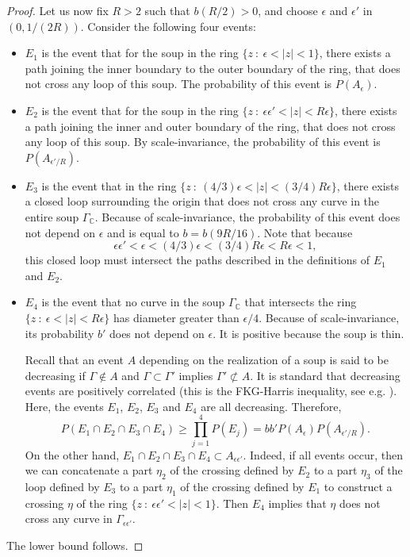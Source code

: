 \documentclass[11pt]{article}
\newcommand{\C}{{{\mathbb C}}}
\newcommand{\eps}{\epsilon}
\newcommand{\PP}{{ P}}
\newcommand{\pa}[1]{\PP (A_{#1})}
\begin{document}
\begin{proof}
Let us now fix $R > 2$ such that $b (R/2)>0$, and  
choose $\eps$ and $\eps'$ in $(0, 1/(2R))$.
Consider the following four events:
\begin {itemize}
\item
$E_1$ is the event that for the soup in the ring $\{z \ : \ \eps < |z | < 1 \}$, 
there exists a path joining the inner boundary to the outer boundary of the ring, 
that does not cross any loop of this soup.
The probability of this event is $\pa { \eps}$.
\item
$E_2$ is the event that for the soup in the ring 
$\{ z \ : \  \eps \eps' < |z | < R \eps \}$, 
there exists a path joining the inner and outer boundary of the ring, 
that does not cross any loop of this soup. 
By scale-invariance, the probability of this event is $\pa {\eps' /R}$.
\item
$E_3$ is the event that in the ring 
$\{ z \ : \ (4/3) \eps    < | z | < (3/4) R \eps \}$, 
there exists a closed loop surrounding the origin that 
does not cross any curve in the entire soup $\Gamma_\C$. 
Because of scale-invariance, the probability of this event 
does not depend on $\eps$ and is equal to $b = b(9R/16)$.
Note that because 
$$\eps \eps' < \eps < (4/3) \eps < (3/4) R \eps < R \eps < 1,$$
this closed loop must intersect the paths described 
in the definitions of $E_1$ and $E_2$.
\item
$E_4$ is the event that no curve in the soup $\Gamma_\C$ that 
intersects the ring    $\{ z \ : \ \eps < | z | < R\eps \}$ 
has diameter greater than $\eps /4$.
Because of scale-invariance, its probability $b'$ does not depend on $\eps$. 
It is positive because the soup is thin.

Recall that an event $A$ depending on the realization of a soup 
is said to be decreasing if 
$\Gamma \notin A$ and $ \Gamma \subset \Gamma'$ implies $\Gamma' \not\subset A$. 
It is standard that decreasing events are positively correlated
(this is the FKG-Harris inequality, see e.g. \cite {J}).
Here, the events $E_1$, $E_2$, $E_3$ and $E_4$ are all decreasing. 
Therefore,
$$ P ( E_1 \cap E_2 \cap E_3 \cap E_4 ) 
\ge \prod_{j=1}^4 P ( E_j) = b b' \pa {\eps} \pa {\eps' /R}.$$
On the other hand, $ E_1 \cap E_2 \cap E_3 \cap E_4 \subset A_{\eps \eps'} $.
Indeed, if all events occur,
then we can concatenate a part $\eta_2$ of the crossing defined by $E_2$ 
to a part $\eta_3$ of the loop defined by $E_3$ 
to a part $\eta_1$ of the crossing defined by $E_1$ 
to construct a crossing $\eta$ of the ring $\{z \ : \  \eps \eps' < |z| < 1 \}$.
Then $E_4$ implies that $\eta$ does not cross any curve in $\Gamma_{\eps\eps'}$.
\end {itemize}
The lower bound follows.
\end {proof}
\end{document}
